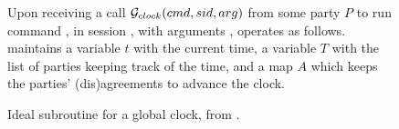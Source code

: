 \begin{figure}[ht]
  \begin{framed}
    \begin{minipage}[t]{\textwidth}
      \textrm{Upon receiving a call $\mathcal{G}_{clock}(cmd,sid,arg)$ from
        some party $P$ to run command \cmd, in session \sid, with arguments
        \arg, \IdealGclock operates as follows.} \\
      \textrm{\IdealGclock maintains a variable $t$ with the current time,
        a variable $T$ with the list of parties keeping track of the time,
        and a map $A$ which keeps the parties' (dis)agreements to advance the
        clock.}
    \end{minipage}
    \vspace*{0.5em}

    \begin{minipage}[t]{0.40\textwidth}
    \end{minipage}
    \hspace*{1.25em}
    \begin{minipage}[t]{0.60\textwidth}
    \end{minipage}
  \end{framed}
  \caption{Ideal subroutine for a global clock, from \cite{kkk21}.}
  \label{fig:gclock}
\end{figure}

